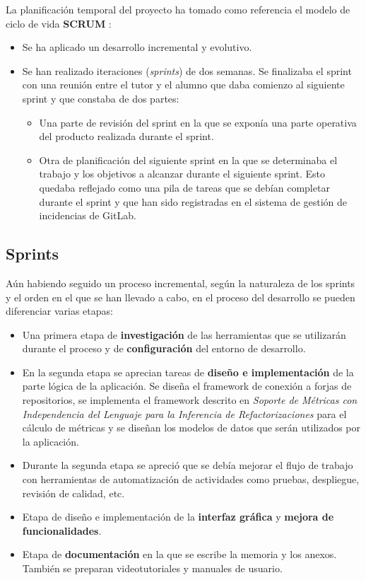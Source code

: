 La planificación temporal del proyecto ha tomado como referencia el modelo de ciclo de vida \textbf{SCRUM} \cite{scrum_master_scrum_2019}:
\begin{itemize}
	\item Se ha aplicado un desarrollo incremental y evolutivo.
	\item Se han realizado iteraciones (\textit{sprints}) de dos semanas. Se finalizaba el sprint con una reunión entre el tutor y el alumno que daba comienzo al siguiente sprint y que constaba de dos partes:
	\begin{itemize}
		\item Una parte de revisión del sprint en la que se exponía una parte operativa del producto realizada durante el sprint.
		\item Otra de planificación del siguiente sprint en la que se determinaba el trabajo y los objetivos a alcanzar durante el siguiente sprint. Esto quedaba reflejado como una pila de tareas que se debían completar durante el sprint y que han sido registradas en el sistema de gestión de incidencias de GitLab.
	\end{itemize}
\end{itemize}

\subsection{Sprints}

Aún habiendo seguido un proceso incremental, según la naturaleza de los sprints y el orden en el que se han llevado a cabo, en el proceso del desarrollo se pueden diferenciar varias etapas:
\begin{itemize}
	\item  Una primera etapa de \textbf{investigación} de las herramientas que se utilizarán durante el proceso y de \textbf{configuración} del entorno de desarrollo.
	
	\item En la segunda etapa se aprecian tareas de \textbf{diseño e implementación} de la parte lógica de la aplicación. Se diseña el framework de conexión a forjas de repositorios, se implementa el framework descrito en \textit{Soporte de Métricas con Independencia del Lenguaje para la Inferencia de Refactorizaciones} \citep{marticorena_sanchez_soporte_2005} para el cálculo de métricas y se diseñan los modelos de datos que serán utilizados por la aplicación.
	
	\item Durante la segunda etapa se apreció que se debía mejorar el flujo de trabajo con herramientas de automatización de actividades como pruebas, despliegue, revisión de calidad, etc.
	
	\item Etapa  de diseño e implementación de la \textbf{interfaz gráfica} y \textbf{mejora de funcionalidades}.
	
	\item Etapa de \textbf{documentación} en la que se escribe la memoria y los anexos. También se preparan videotutoriales y manuales de usuario.
\end{itemize}

